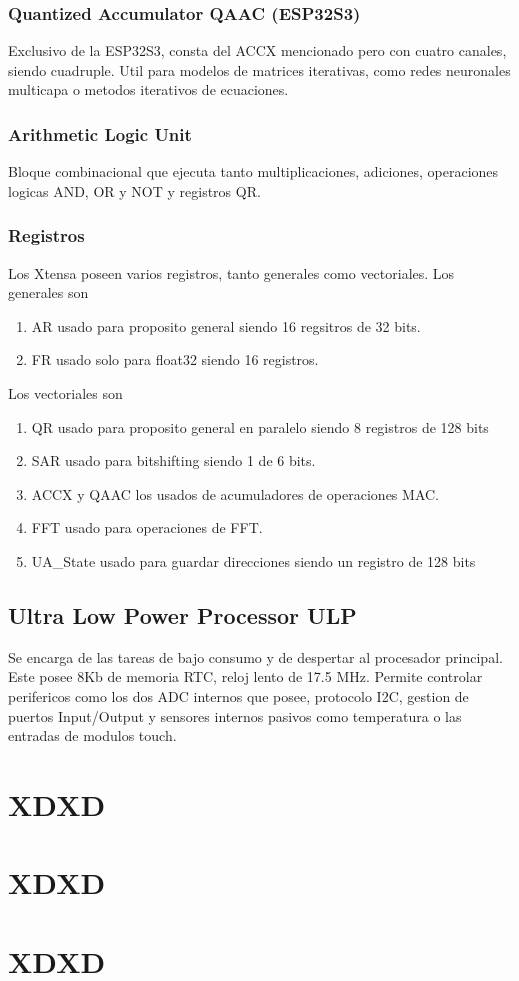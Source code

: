 \documentclass[12pt, a4paper]{article}
\begin{document}
\subsubsection{Quantized Accumulator QAAC (ESP32S3)}
Exclusivo de la ESP32S3, consta del ACCX mencionado pero con cuatro canales, siendo cuadruple. Util para modelos de matrices iterativas, como redes neuronales multicapa o metodos iterativos de ecuaciones. 

\subsubsection{Arithmetic Logic Unit}
Bloque combinacional que ejecuta tanto multiplicaciones, adiciones, operaciones logicas AND, OR y NOT y registros QR.

\subsubsection{Registros}
Los Xtensa poseen varios registros, tanto generales como vectoriales.
Los generales son
\begin{enumerate}
    \item AR usado para proposito general siendo 16 regsitros de 32 bits.
    \item FR usado solo para float32 siendo 16 registros. 
\end{enumerate}
Los vectoriales son
\begin{enumerate}
    \item QR usado para proposito general en paralelo siendo 8 registros de 128 bits
    \item SAR usado para bitshifting siendo 1 de 6 bits.
    \item ACCX y QAAC los usados de acumuladores de operaciones MAC.
    \item FFT usado para operaciones de FFT. 
    \item UA_State usado para guardar direcciones siendo un registro de 128 bits
\end{enumerate}

\subsection{Ultra Low Power Processor ULP}
Se encarga de las tareas de bajo consumo y de despertar al procesador principal. 
Este posee 8Kb de memoria RTC, reloj lento de 17.5 MHz.
Permite controlar perifericos como los dos ADC internos que posee, protocolo I2C, gestion de puertos Input/Output y sensores internos pasivos como temperatura o las entradas de modulos touch.

\section{XDXD}

\section{XDXD}

\section{XDXD}
\end{document}
